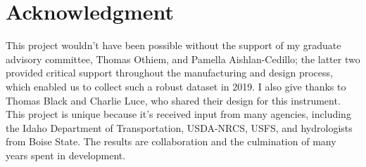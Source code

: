 \chapter*{Acknowledgment}

This project wouldn't have been possible without the support of my graduate advisory committee, Thomas Othiem, and Pamella Aishlan-Cedillo; the latter two provided critical support throughout the manufacturing and design process, which enabled us to collect such a robust dataset in 2019. I also give thanks to Thomas Black and Charlie Luce, who shared their design for this instrument. This project is unique because it's received input from many agencies, including the Idaho Department of Transportation, USDA-NRCS, USFS, and hydrologists from Boise State. The results are collaboration and the culmination of many years spent in development. 